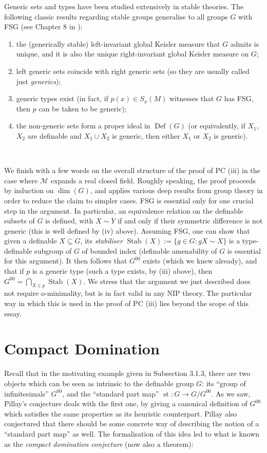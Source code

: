 \documentclass[a4paper]{report}
\newcommand{\ind}{\hspace{15pt}}
\newcommand{\M}{\mathcal{M}}
\DeclareMathOperator{\Def}{Def}
\DeclareMathOperator{\st}{st}
\DeclareMathOperator{\Stab}{Stab}
\theoremstyle{definition}
\theoremstyle{remstyle}
\begin{document}
\ind Generic sets and types have been studied extensively in stable theories. The following classic results regarding stable groups generalise to all groups $G$ with FSG (see Chapter 8 in \cite{nip guide}):

\begin{enumerate}
	\item the (generically stable) left-invariant global Keisler measure that $G$ admits is unique, and it is also the unique right-invariant global Keisler measure on $G$;
	\item left generic sets coincide with right generic sets (so they are usually called just \emph{generics});
	\item generic types exist (in fact, if $p(x)\in S_x(M)$ witnesses that $G$ has FSG, then $p$ can be taken to be generic);
	\item the non-generic sets form a proper ideal in $\Def(G)$ (or equivalently, if $X_1$, $X_2$ are definable and $X_1\cup X_2$ is generic, then either $X_1$ or $X_2$ is generic).
\end{enumerate}
\

\ind We finish with a few words on the overall structure of the proof of PC (iii) in the case where $\M$ expands a real closed field. Roughly speaking, the proof proceeds by induction on $\dim(G)$, and applies various deep results from group theory in order to reduce the claim to simpler cases. FSG is essential only for one crucial step in the argument. In particular, an equivalence relation on the definable subsets of $G$ is defined, with $X\sim Y$ if and only if their symmetric difference is not generic (this is well defined by (iv) above). Assuming FSG, one can show that given a definable $X\subseteq G$, its \emph{stabiliser} $\Stab(X):=\{g\in G: gX\sim X\}$ is a type-definable subgroup of $G$ of bounded index (definable amenability of $G$ is essential for this argument). It then follows that $G^{00}$ exists (which we knew already), and that if $p$ is a generic type (such a type exists, by (iii) above), then $G^{00}=\bigcap_{X\in p}\Stab(X)$. We stress that the argument we just described does not require o-minimality, but is in fact valid in any NIP theory. The particular way in which this is used in the proof of PC (iii) lies beyond the scope of this essay.

\section{Compact Domination}

\ind Recall that in the motivating example given in Subsection 3.1.3, there are two objects which can be seen as intrinsic to the definable group $G$: its ``group of infinitesimals'' $G^{00}$, and the ``standard part map'' $\st:G\to G/G^{00}$. As we saw, Pillay's conjecture deals with the first one, by giving a canonical definition of $G^{00}$ which satisfies the same properties as its heuristic counterpart. Pillay also conjectured that there should be some concrete way of describing the notion of a ``standard part map'' as well. The formalisation of this idea led to what is known as the \emph{compact domination conjecture} (now also a theorem):
\end{document}
